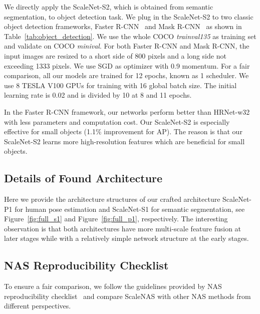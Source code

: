 \documentclass[final]{cvpr}
\newcommand{\workname}{ScaleNAS\xspace}
\newcommand{\netname}{ScaleNet\xspace}
\begin{document}
We directly apply the \netname-S2, which is obtained from semantic segmentation, to object detection task. 
We plug in the \netname-S2 to two classic object detection frameworks, Faster R-CNN~\cite{ren2015faster} and Mask R-CNN~\cite{he2017mask} as shown in Table~\ref{tab:object_detection}. We use the whole COCO \textit{trainval135} as training set and validate on COCO \textit{minival}. For both Faster R-CNN and Mask R-CNN, the input images are resized to a short side of 800 pixels and a long side not exceeding 1333 pixels. We use SGD as optimizer with 0.9 momentum. For a fair comparison, all our models are trained for 12 epochs, known as 1 scheduler. We use 8 TESLA V100 GPUs for training with 16 global batch size. The initial learning rate is 0.02 and is divided by 10 at 8 and 11 epochs. 

In the Faster R-CNN framework, our networks perform better than HRNet-w32 with less parameters and computation cost. Our \netname-S2 is especially effective for small objects (1.1\% improvement for AP). The reason is that our \netname-S2 learns more high-resolution features which are beneficial for small objects. 

\subsection{Details of Found Architecture}
Here we provide the architecture structures of our crafted architecture \netname-P1 for human pose estimation and \netname-S1 for semantic segmentation, see Figure~\ref{fig:full_s1} and Figure~\ref{fig:full_p1}, respectively. 
The interesting observation is that both architectures have more multi-scale feature fusion at later stages while with a relatively simple network structure at the early stages. 


\subsection{NAS Reproducibility Checklist}
To ensure a fair comparison, we follow the guidelines provided by NAS reproducibility checklist~\cite{lindauer2019best} and compare \workname with other NAS methods from different perspectives.
\end{document}
